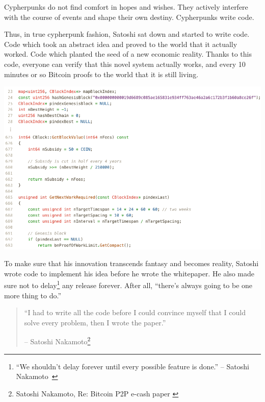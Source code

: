 Cypherpunks do not find comfort in hopes and wishes. They actively
interfere with the course of events and shape their own destiny.
Cypherpunks write code.

Thus, in true cypherpunk fashion, Satoshi sat down and started to write
code. Code which took an abstract idea and proved to the world that it
actually worked. Code which planted the seed of a new economic reality.
Thanks to this code, everyone can verify that this novel system actually
works, and every 10 minutes or so Bitcoin proofs to the world that it is
still living.

\begin{center}
  \includegraphics[width=\textwidth]{assets/images/bitcoin-code-white.png}
  \label{fig:bitcoin-code-white}
\end{center}

To make sure that his innovation transcends fantasy and becomes reality, Satoshi
wrote code to implement his idea before he wrote the whitepaper. He also made
sure not to delay\footnote{\enquote{We shouldn't delay forever until every possible
feature is done.} -- Satoshi Nakamoto~\cite{satoshi-delay}} any release forever.
After all, \enquote{there's always going to be one more thing to do.}

\begin{quotation}\begin{samepage}
\enquote{I had to write all the code before I could convince myself that I
could solve every problem, then I wrote the paper.}
\begin{flushright} -- Satoshi Nakamoto\footnote{Satoshi Nakamoto, Re: Bitcoin P2P e-cash paper \cite{satoshi-mail-code-first}}
\end{flushright}\end{samepage}\end{quotation}

